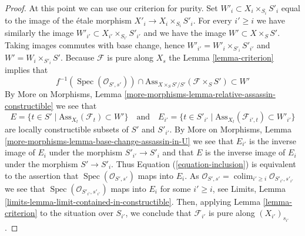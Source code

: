 \documentclass[10pt,a4paper]{amsart}
\theoremstyle{plain}
\theoremstyle{definition}
\theoremstyle{remark}
\numberwithin{equation}{subsection}
\def\colim{\mathop{\mathrm{colim}}\nolimits}
\def\Spec{\mathop{\mathrm{Spec}}}
\begin{document}
\begin{proof}
\medskip\noindent
At this point we can use our criterion for purity.
Set $W'_i \subset X_i \times_{S_i} S'_i$ equal to the image of the
\'etale morphism $X'_i \to X_i \times_{S_i} S'_i$. For every $i' \geq i$
we have similarly the image $W'_{i'} \subset X_{i'} \times_{S_{i'}} S'_{i'}$
and we have the image $W' \subset X \times_S S'$. Taking images commutes
with base change, hence $W'_{i'} = W'_i \times_{S'_i} S'_{i'}$ and
$W' = W_i \times_{S'_i} S'$. Because
$\mathcal{F}$ is pure along $X_s$ the
Lemma \ref{lemma-criterion}
implies that
\begin{equation}
\label{equation-inclusion}
f^{-1}(\Spec(\mathcal{O}_{S', s'})) \cap
\text{Ass}_{X \times_S S'/S'}(\mathcal{F} \times_S S') \subset W'
\end{equation}
By
More on Morphisms,
Lemma \ref{more-morphisms-lemma-relative-assassin-constructible}
we see that
$$
E = \{t \in S' \mid \text{Ass}_{X_t}(\mathcal{F}_t) \subset W' \}
\quad\text{and}\quad
E_{i'} = \{t \in S'_{i'} \mid
\text{Ass}_{X_t}(\mathcal{F}_{i', t}) \subset W'_{i'} \}
$$
are locally constructible subsets of $S'$ and $S'_{i'}$. By
More on Morphisms,
Lemma \ref{more-morphisms-lemma-base-change-assassin-in-U}
we see that $E_{i'}$ is the inverse image of $E_i$ under the morphism
$S'_{i'} \to S'_i$ and that $E$ is the inverse image of $E_i$ under
the morphism $S' \to S'_i$. Thus
Equation (\ref{equation-inclusion})
is equivalent to the assertion that
$\Spec(\mathcal{O}_{S', s'})$ maps into $E_i$. As
$\mathcal{O}_{S', s'} =
\colim_{i' \geq i} \mathcal{O}_{S'_{i'}, s'_{i'}}$
we see that $\Spec(\mathcal{O}_{S'_{i'}, s'_{i'}})$
maps into $E_i$ for some $i' \geq i$, see
Limits, Lemma \ref{limits-lemma-limit-contained-in-constructible}.
Then, applying
Lemma \ref{lemma-criterion}
to the situation over $S_{i'}$,
we conclude that $\mathcal{F}_{i'}$ is pure along $(X_{i'})_{s_{i'}}$.
\end{proof}
\end{document}
